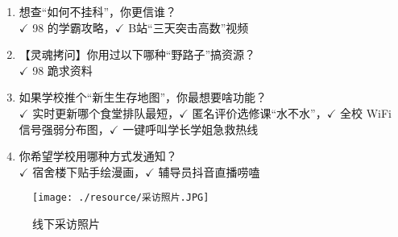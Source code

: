 \begin{enumerate}
    \item 想查“如何不挂科”，你更信谁？\\
    $\checkmark$ 98 的学霸攻略，$\checkmark$ B站“三天突击高数”视频

    \item 【灵魂拷问】你用过以下哪种“野路子”搞资源？\\
    $\checkmark$ 98 跪求资料

    \item 如果学校推个“新生生存地图”，你最想要啥功能？\\
    $\checkmark$ 实时更新哪个食堂排队最短，$\checkmark$ 匿名评价选修课“水不水”，$\checkmark$ 全校 WiFi 信号强弱分布图，$\checkmark$ 一键呼叫学长学姐急救热线

    \item 你希望学校用哪种方式发通知？\\
    $\checkmark$ 宿舍楼下贴手绘漫画，$\checkmark$ 辅导员抖音直播唠嗑

\end{enumerate}

\begin{figure}[H]
    \centering
    \texttt{[image: ./resource/采访照片.JPG]}
    \caption{线下采访照片}
\end{figure}